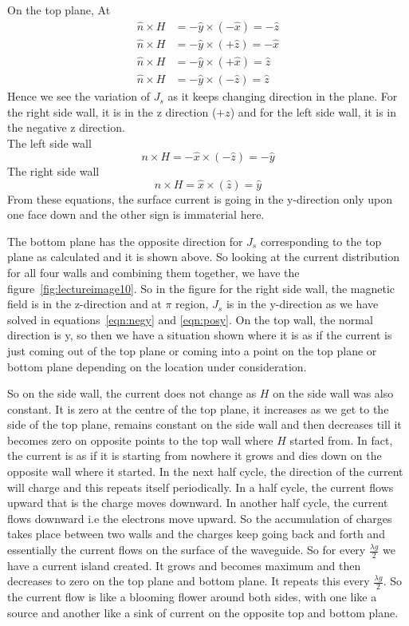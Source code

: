 On the top plane, At
\begin{align*}
\hat{n} \times H &= -\hat{y} \times (-\hat{x})= -\hat{z}\\
\hat{n} \times H &= -\hat{y} \times (+\hat{z})= -\hat{x}\\
\hat{n} \times H &= -\hat{y} \times (+\hat{x})= \hat{z}\\
\hat{n} \times H &= -\hat{y} \times (-\hat{z})= \hat{z}
\end{align*}
Hence we see the variation of $J_{s}$ as it keeps changing direction in the plane. For the right side wall, it is in the z direction ($+z$) and for the left side wall, it is in the negative z direction.\\
The left side wall   
\begin{equation}
n\times H = -\hat{x} \times (-\hat{z})= -\hat{y}
\label{eqn:negy}
\end{equation}
The right side wall 
\begin{equation}
n \times H = \hat{x} \times (\hat{z}) = \hat{y}
\label{eqn:posy}
\end{equation}
From these equations, the surface current is going in the y-direction only upon one face down and the other sign is immaterial here.
	
The bottom plane has the opposite direction for $J_{s}$ corresponding to the top plane as calculated and it is shown above. So looking at the current distribution for all four walls and combining them together, we have the figure~\ref{fig:lectureimage10}. So in the figure for the right side wall, the magnetic field is in the z-direction and at $\pi$ region, $J_{s}$ is in the y-direction as we have solved in equations~\ref{eqn:negy} and \ref{eqn:posy}. On the top wall, the normal direction is y, so then we have a situation shown where it is as if the current is just coming out of the top plane or coming into a point on the top plane or bottom plane depending on the location under consideration. 

So on the side wall, the current does not change as $H$ on the side wall was also constant. It is zero at the centre of the top plane, it increases as we get to the side of the top plane, remains constant on the side wall and then decreases till it becomes zero on opposite points to the top wall where $H$ started from. In fact, the current is as if it is starting from nowhere it grows and dies down on the opposite wall where it started. In the next half cycle, the direction of the current will charge and this repeats itself periodically. In a half cycle, the current flows upward that is the charge moves downward. In another half cycle, the current flows downward i.e the electrons move upward. So the accumulation of charges takes place between two walls and the charges keep going back and forth and essentially the current flows on the surface of the waveguide. So for every $\frac{\lambda g}{2}$ we have a current island created. It grows and becomes maximum and then decreases to zero on the top plane and bottom plane. It repeats this every $\frac{\lambda g}{2}$. So the current flow is like a blooming flower around both sides, with one like a source and another like a sink of current on the opposite top and bottom plane.
	
